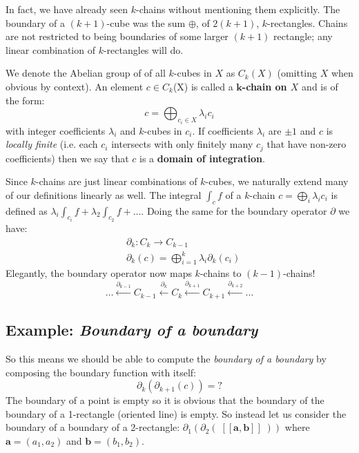 In fact, we have already seen $k$-chains without mentioning them explicitly.
The boundary of a $(k+1)$-cube was the sum $\oplus$, of $2(k+1)$, $k$-rectangles.
Chains are not restricted to being boundaries of some larger $(k+1)$ rectangle; 
any linear combination of $k$-rectangles will do.


\begin{definition}
We denote the Abelian group of of all $k$-cubes in $X$ as $C_k(X)$ (omitting $X$ when obvious by context).
An element $c \in C_k$(X) is called a \textbf{$\boldsymbol{k}$-chain on $X$} and is of the form:
\begin{equation*}
	c = \bigoplus_{c_i \in X} \lambda_i c_i
\end{equation*}
with integer coefficients $\lambda_i$ and  $k$-cubes in $c_i$.
If coefficients $\lambda_i$ are $\pm 1$ and $c$ is \emph{locally finite} (i.e. each $c_i$ intersects with only finitely many $c_j$ that have non-zero coefficients) then we say that $c$ is a \textbf{domain of integration}.
\end{definition}


		
Since $k$-chains are just linear combinations of $k$-cubes, we naturally extend many of our definitions linearly as well.
The integral $\int_c f$ of a $k$-chain $c=\bigoplus_i \lambda_i c_i$ is defined as $\lambda_i \int_{c_i} f  + \lambda_2 \int_{c_2} f + \ldots$.
Doing the same for the boundary operator $\partial$ we have:
\begin{align*}
	&\partial_k: C_k \to C_{k-1} \\
	&\partial_k(c) = \bigoplus_{i=1}^k \lambda_i \partial_k(c_i)
\end{align*}
Elegantly, the boundary operator now maps $k$-chains to $(k-1)$-chains!
\begin{equation*}
	\ldots \xleftarrow{\partial_{k-1}} C_{k-1} \xleftarrow{\partial_{k}} C_k \xleftarrow{\partial_{k+1}} C_{k+1} \xleftarrow{\partial_{k+2}} ...
\end{equation*}






\subsection{Example: \emph{Boundary of a boundary}}

So this means we should be able to compute the \emph{boundary of a boundary} 
by composing the boundary function with itself:
\begin{equation*}
	\partial_k ( \partial_{k+1} (c)) = ?
\end{equation*}
The boundary of a point is empty so it is obvious that the boundary of the boundary of a 1-rectangle (oriented line) 
is empty.
So instead let us consider the boundary of a boundary of a 2-rectangle: 
$\partial_1 ( \partial_2 ( \; [\![\boldsymbol{a}, \boldsymbol{b} ]\!] \; ) )$
where $\boldsymbol{a} =(a_1,a_2)$ and $\boldsymbol{b}= (b_1,b_2)$.



